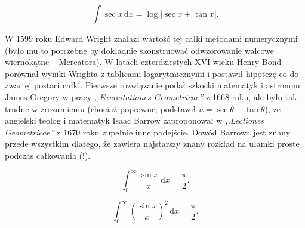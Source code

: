 \begin{problem}
    \begin{equation}
        \int \sec x \,\mathrm{d} x = \log| \sec x + \tan x|.
    \end{equation}
\end{problem}

W 1599 roku Edward Wright znalazł wartość tej całki metodami numerycznymi (było mu to potrzebne by dokładnie skonstruować odwzorowanie walcowe wiernokątne -- Mercatora).
%
%
W latach czterdziestych XVI wieku Henry Bond porównał wyniki Wrighta z tablicami logarytmicznymi i postawił hipotezę co do zwartej postaci całki.
%
Pierwsze rozwiązanie podał szkocki matematyk i astronom James Gregory w pracy \emph{,,Exercitationes Geometricae''} z 1668 roku, ale było tak trudne w zrozumieniu (chociaż poprawne; podstawił $u = \sec \theta + \tan \theta$), że angielski teolog i matematyk Isaac Barrow zaproponował w \emph{,,Lectiones Geometricae''} z 1670 roku zupełnie inne podejście.
%
%
Dowód Barrowa jest znany przede wszystkim dlatego, że zawiera najstarszy znany rozkład na ułamki proste podczas całkowania (!).
%

\begin{problem}
    \begin{equation}
        \int_0^\infty \frac {\sin x}{x} \,\mathrm{d} x = \frac \pi 2.
    \end{equation}
\end{problem}

\begin{problem}
    \begin{equation}
        \int_0^\infty \left(\frac {\sin x}{x}\right)^2 \,\mathrm{d} x = \frac \pi 2.
    \end{equation}
\end{problem}